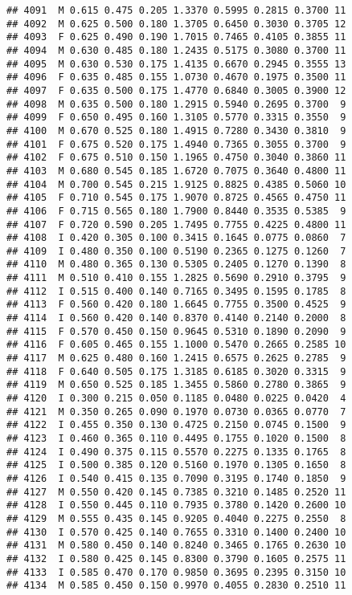 \documentclass[
]{article}
\begin{document}
\begin{verbatim}
## 4091  M 0.615 0.475 0.205 1.3370 0.5995 0.2815 0.3700 11
## 4092  M 0.625 0.500 0.180 1.3705 0.6450 0.3030 0.3705 12
## 4093  F 0.625 0.490 0.190 1.7015 0.7465 0.4105 0.3855 11
## 4094  M 0.630 0.485 0.180 1.2435 0.5175 0.3080 0.3700 11
## 4095  M 0.630 0.530 0.175 1.4135 0.6670 0.2945 0.3555 13
## 4096  F 0.635 0.485 0.155 1.0730 0.4670 0.1975 0.3500 11
## 4097  F 0.635 0.500 0.175 1.4770 0.6840 0.3005 0.3900 12
## 4098  M 0.635 0.500 0.180 1.2915 0.5940 0.2695 0.3700  9
## 4099  F 0.650 0.495 0.160 1.3105 0.5770 0.3315 0.3550  9
## 4100  M 0.670 0.525 0.180 1.4915 0.7280 0.3430 0.3810  9
## 4101  F 0.675 0.520 0.175 1.4940 0.7365 0.3055 0.3700  9
## 4102  F 0.675 0.510 0.150 1.1965 0.4750 0.3040 0.3860 11
## 4103  M 0.680 0.545 0.185 1.6720 0.7075 0.3640 0.4800 11
## 4104  M 0.700 0.545 0.215 1.9125 0.8825 0.4385 0.5060 10
## 4105  F 0.710 0.545 0.175 1.9070 0.8725 0.4565 0.4750 11
## 4106  F 0.715 0.565 0.180 1.7900 0.8440 0.3535 0.5385  9
## 4107  F 0.720 0.590 0.205 1.7495 0.7755 0.4225 0.4800 11
## 4108  I 0.420 0.305 0.100 0.3415 0.1645 0.0775 0.0860  7
## 4109  I 0.480 0.350 0.100 0.5190 0.2365 0.1275 0.1260  7
## 4110  M 0.480 0.365 0.130 0.5305 0.2405 0.1270 0.1390  8
## 4111  M 0.510 0.410 0.155 1.2825 0.5690 0.2910 0.3795  9
## 4112  I 0.515 0.400 0.140 0.7165 0.3495 0.1595 0.1785  8
## 4113  F 0.560 0.420 0.180 1.6645 0.7755 0.3500 0.4525  9
## 4114  I 0.560 0.420 0.140 0.8370 0.4140 0.2140 0.2000  8
## 4115  F 0.570 0.450 0.150 0.9645 0.5310 0.1890 0.2090  9
## 4116  F 0.605 0.465 0.155 1.1000 0.5470 0.2665 0.2585 10
## 4117  M 0.625 0.480 0.160 1.2415 0.6575 0.2625 0.2785  9
## 4118  F 0.640 0.505 0.175 1.3185 0.6185 0.3020 0.3315  9
## 4119  M 0.650 0.525 0.185 1.3455 0.5860 0.2780 0.3865  9
## 4120  I 0.300 0.215 0.050 0.1185 0.0480 0.0225 0.0420  4
## 4121  M 0.350 0.265 0.090 0.1970 0.0730 0.0365 0.0770  7
## 4122  I 0.455 0.350 0.130 0.4725 0.2150 0.0745 0.1500  9
## 4123  I 0.460 0.365 0.110 0.4495 0.1755 0.1020 0.1500  8
## 4124  I 0.490 0.375 0.115 0.5570 0.2275 0.1335 0.1765  8
## 4125  I 0.500 0.385 0.120 0.5160 0.1970 0.1305 0.1650  8
## 4126  I 0.540 0.415 0.135 0.7090 0.3195 0.1740 0.1850  9
## 4127  M 0.550 0.420 0.145 0.7385 0.3210 0.1485 0.2520 11
## 4128  I 0.550 0.445 0.110 0.7935 0.3780 0.1420 0.2600 10
## 4129  M 0.555 0.435 0.145 0.9205 0.4040 0.2275 0.2550  8
## 4130  I 0.570 0.425 0.140 0.7655 0.3310 0.1400 0.2400 10
## 4131  M 0.580 0.450 0.140 0.8240 0.3465 0.1765 0.2630 10
## 4132  I 0.580 0.425 0.145 0.8300 0.3790 0.1605 0.2575 11
## 4133  I 0.585 0.470 0.170 0.9850 0.3695 0.2395 0.3150 10
## 4134  M 0.585 0.450 0.150 0.9970 0.4055 0.2830 0.2510 11

\end{verbatim}
\end{document}
